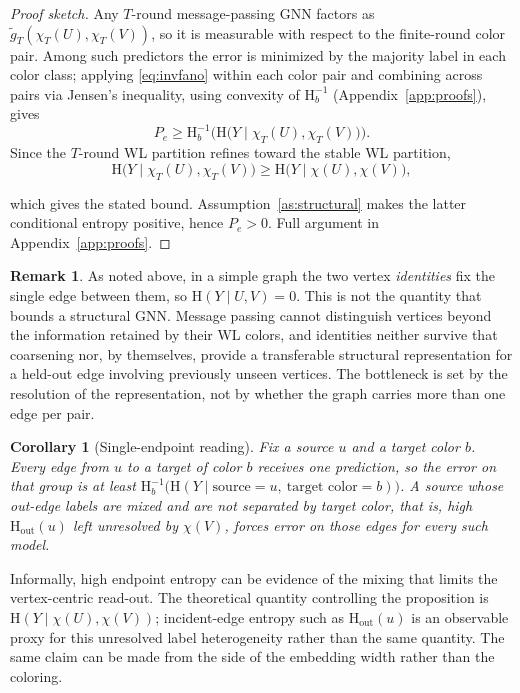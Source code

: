 \documentclass[sigconf, review, anonymous]{acmart}
\newcommand{\Hh}{\mathrm{H}}
\newcommand{\outdeg}{\mathrm{out}}
\theoremstyle{plain}
\newtheorem{corollary}{Corollary}
\theoremstyle{definition}
\newtheorem{remark}{Remark}
\begin{document}
\begin{proof}[Proof sketch]
Any $T$-round message-passing GNN factors as $\tilde g_T(\chi_T(U),\chi_T(V))$, so it is measurable with respect to the finite-round color pair. Among such predictors the error is minimized by the majority label in each color class; applying \eqref{eq:invfano} within each color pair and combining across pairs via Jensen's inequality, using convexity of $\Hh_b^{-1}$ (Appendix~\ref{app:proofs}), gives 
\begin{equation}   
P_e \ge \Hh_b^{-1}\Big(\Hh\big(Y\mid\chi_T(U),\chi_T(V)\big) \Big).
\end{equation}
Since the $T$-round WL partition refines toward the stable WL partition,
\begin{equation}   
\Hh\big(Y\mid\chi_T(U),\chi_T(V)\big) \ge \Hh\big(Y\mid\chi(U),\chi(V)\big),
\end{equation}

which gives the stated bound. Assumption~\ref{as:structural} makes the latter conditional entropy positive, hence $P_e>0$. Full argument in Appendix~\ref{app:proofs}.
\end{proof}

\begin{remark}
As noted above, in a simple graph the two vertex \emph{identities} fix the single edge between them, so $\Hh(Y\mid U,V)=0$. This is not the quantity that bounds a structural GNN. Message passing cannot distinguish vertices beyond the information retained by their WL colors, and identities neither survive that coarsening nor, by themselves, provide a transferable structural representation for a held-out edge involving previously unseen vertices. The bottleneck is set by the resolution of the representation, not by whether the graph carries more than one edge per pair.\end{remark}

\begin{corollary}[Single-endpoint reading]
\label{cor:endpoint}
Fix a source $u$ and a target color $b$. Every edge from $u$ to a target of color $b$ receives one prediction, so the error on that group is at least $\Hh_b^{-1}\big(\Hh(Y\mid \text{source}{=}u,\ \text{target color}{=}b)\big)$. A source whose out-edge labels are mixed and are not separated by target color, that is, high $\Hh_\outdeg(u)$ left unresolved by $\chi(V)$, forces error on those edges for every such model.
\end{corollary}

Informally, high endpoint entropy can be evidence of the mixing that limits the vertex-centric read-out. The theoretical quantity controlling the proposition is $\Hh(Y\mid\chi(U),\chi(V))$; incident-edge entropy such as $\Hh_\outdeg(u)$ is an observable proxy for this unresolved label heterogeneity rather than the same quantity. The same claim can be made from the side of the embedding width rather than the coloring. 
\end{document}
